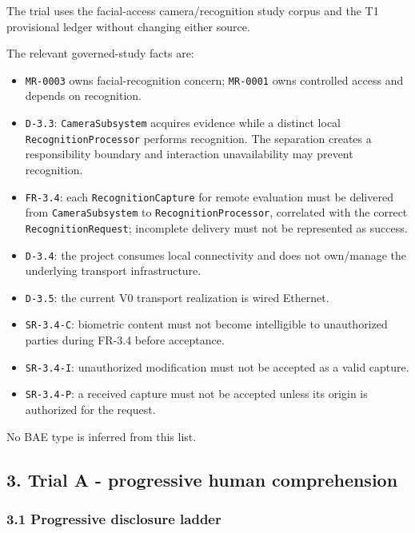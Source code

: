 \documentclass[
  10pt,
  a4paper,
]{article}
\providecommand{\tightlist}{%
  \setlength{\itemsep}{0pt}\setlength{\parskip}{0pt}}
\begin{document}
The trial uses the facial-access camera/recognition study corpus and the
T1 provisional ledger without changing either source.

The relevant governed-study facts are:

\begin{itemize}
\tightlist
\item
  \texttt{MR-0003} owns facial-recognition concern; \texttt{MR-0001}
  owns controlled access and depends on recognition.
\item
  \texttt{D-3.3}: \texttt{CameraSubsystem} acquires evidence while a
  distinct local \texttt{RecognitionProcessor} performs recognition. The
  separation creates a responsibility boundary and interaction
  unavailability may prevent recognition.
\item
  \texttt{FR-3.4}: each \texttt{RecognitionCapture} for remote
  evaluation must be delivered from \texttt{CameraSubsystem} to
  \texttt{RecognitionProcessor}, correlated with the correct
  \texttt{RecognitionRequest}; incomplete delivery must not be
  represented as success.
\item
  \texttt{D-3.4}: the project consumes local connectivity and does not
  own/manage the underlying transport infrastructure.
\item
  \texttt{D-3.5}: the current V0 transport realization is wired
  Ethernet.
\item
  \texttt{SR-3.4-C}: biometric content must not become intelligible to
  unauthorized parties during FR-3.4 before acceptance.
\item
  \texttt{SR-3.4-I}: unauthorized modification must not be accepted as a
  valid capture.
\item
  \texttt{SR-3.4-P}: a received capture must not be accepted unless its
  origin is authorized for the request.
\end{itemize}

No BAE type is inferred from this list.

\subsection{3. Trial A - progressive human
comprehension}\label{3-trial-a---progressive-human-comprehension}

\subsubsection{3.1 Progressive disclosure
ladder}\label{31-progressive-disclosure-ladder}
\end{document}
